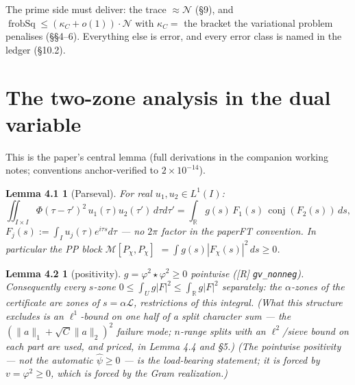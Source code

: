 \documentclass[11pt]{amsart}
\newcommand{\conj}{\operatorname{conj}}
\DeclareMathOperator{\frobSq}{frobSq}
\theoremstyle{plain}
\newtheorem*{lemmafourone}{Lemma 4.1}
\newtheorem*{lemmafourtwo}{Lemma 4.2}
\theoremstyle{remark}
\begin{document}
The prime side must deliver: the trace $\approx \mathcal{N}$ (\S9), and
$\frobSq \le (\kappa_C + o(1))\cdot\mathcal{N}$ with $\kappa_C =$ the bracket the
variational problem penalises (\S\S4--6). Everything else is error, and every error
class is named in the ledger (\S10.2).

\section{The two-zone analysis in the dual variable}

This is the paper's central lemma (full derivations in the companion working notes;
conventions anchor-verified to $2\times10^{-14}$).

\begin{lemmafourone}[Parseval]
For real $u_1, u_2 \in L^1(I)$:
\[
\iint_{I\times I} \Phi(\tau-\tau')^2\, u_1(\tau)u_2(\tau')\, d\tau d\tau'
= \int_{\mathbb{R}} g(s)\, F_1(s)\, \conj(F_2(s))\, ds,
\]
$F_j(s) := \int_I u_j(\tau)e^{i\tau s}d\tau$ --- no $2\pi$ factor
in the paperFT convention. In particular the PP block $\mathcal{M}[P_\chi, P_\chi]$
$= \int g(s)|F_\chi(s)|^2\, ds \ge 0$.
\end{lemmafourone}

\begin{lemmafourtwo}[positivity]
$g = \varphi^2\star\varphi^2 \ge 0$ pointwise ([R] \texttt{gv\_nonneg}). Consequently
every $s$-zone $0 \le \int_U g|F|^2 \le \int_{\mathbb{R}} g|F|^2$ separately: the
$\alpha$-zones of the certificate are zones of $s = \alpha\mathcal{L}$, restrictions
of this integral. (What this structure excludes is an $\ell^1$-bound on one half of a
split character sum --- the $(\lVert a\rVert_1 + \sqrt{C}\lVert a\rVert_2)^2$ failure
mode; $n$-range splits with an $\ell^2$/sieve bound on each part are used, and priced,
in Lemma 4.4 and \S5.) (The pointwise positivity --- not the automatic
$\widehat{\psi} \ge 0$ --- is the load-bearing statement; it is forced by
$v = \varphi^2 \ge 0$, which is forced by the Gram realization.)
\end{lemmafourtwo}
\end{document}
